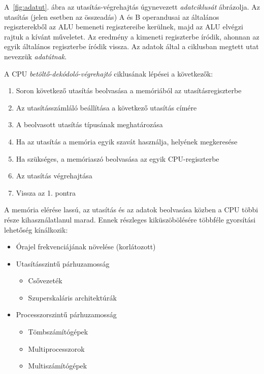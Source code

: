 \documentclass[10pt]{article}
\begin{document}
A~\ref{fig:adatut}. ábra az utasítás-végrehajtás úgynevezett \emph{adatciklusát} ábrázolja. Az utasítás (jelen esetben az összeadás) A és B operandusai az általános regiszterekből az ALU bemeneti regisztereibe kerülnek, majd az ALU elvégzi rajtuk a kívánt műveletet. Az eredmény a kimeneti regiszterbe íródik, ahonnan az egyik általános regiszterbe íródik vissza. Az adatok által a ciklusban megtett utat nevezzük \emph{adatútnak}.

A CPU \emph{betöltő-dekódoló-végrehajtó} ciklusának lépései a következők:

\begin{enumerate}
	\item Soron következő utasítás beolvasása a memóriából az utasításregiszterbe
	\item Az utasításszámláló beállítása a következő utasítás címére
	\item A beolvasott utasítás típusának meghatározása
	\item Ha az utasítás a memória egyik szavát használja, helyének megkeresése
	\item Ha szükséges, a memóriaszó beolvasása az egyik CPU-regiszterbe
	\item Az utasítás végrehajtása
	\item Vissza az 1. pontra
\end{enumerate}

A memória elérése lassú, az utasítás és az adatok beolvasása közben a CPU többi része kihasználatlanul marad. Ennek részleges kiküszöbölésére többféle gyorsítási lehetőség kínálkozik:

\begin{itemize}
	\item Órajel frekvenciájának növelése (korlátozott)
	\item Utasításszintű párhuzamosság
		\begin{itemize}
			\item Csővezeték
			\item Szuperskaláris architektúrák
		\end{itemize}
	\item Processzorszintű párhuzamosság
		\begin{itemize}
			\item Tömbszámítógépek
			\item Multiprocesszorok
			\item Multiszámítógépek
		\end{itemize}
\end{itemize}
\end{document}
